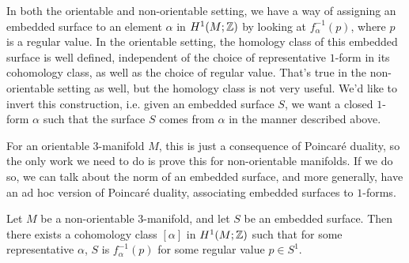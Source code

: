 In both the orientable and non-orientable setting, we have a way of assigning an embedded surface
to an element $\alpha$ in $H^1(M; \mathbb{Z})$ by looking at $f_{\alpha}^{-1}(p)$, where $p$ is a regular
value. In the orientable setting, the homology class of this embedded surface is well defined,
independent of the choice of representative $1$-form in its cohomology class, as well as the choice
of regular value. That's true in the non-orientable setting as well, but the homology class is not
very useful. We'd like to invert this construction, i.e. given an embedded surface $S$, we want a
closed $1$-form $\alpha$ such that the surface $S$ comes from $\alpha$ in the manner described
above.

For an orientable $3$-manifold $M$, this is just a consequence of Poincar\'e duality, so the only
work we need to do is prove this for non-orientable manifolds. If we do so, we can talk about the
norm of an embedded surface, and more generally, have an ad hoc version of Poincar\'e duality,
associating embedded surfaces to $1$-forms.
\begin{thm}
  \label{thm:Poincare-duality}
  Let $M$ be a non-orientable $3$-manifold, and let $S$ be an embedded surface. Then
  there exists a cohomology class $[\alpha]$ in $H^1(M; \mathbb{Z})$ such that for some representative
  $\alpha$, $S$ is $f_{\alpha}^{-1}(p)$ for some regular value $p \in S^1$.
\end{thm}

